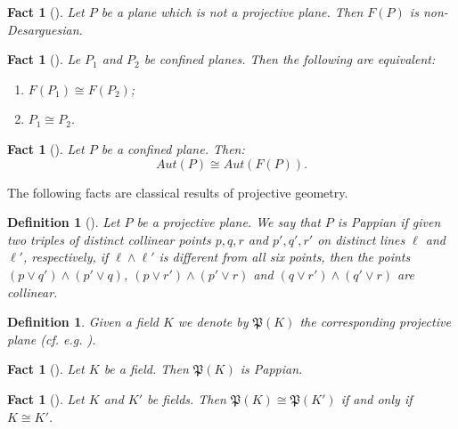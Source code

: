 \documentclass{amsart}
\newtheorem{definition}[theorem]{Definition}
\newtheorem{fact}[theorem]{Fact}
\numberwithin{claimcounter}{theorem}
\begin{document}
	\begin{fact}[{\cite[Theorem 4.6]{hall_proj}}]\label{desargue_fact} Let $P$ be a plane which is not a projective plane. Then $F(P)$ is non-Desarguesian.
\end{fact}

	\begin{fact}[{\cite[Theorem 11.11]{piper}}]\label{piper_fact1} Le $P_1$ and $P_2$ be confined planes. Then the following are equivalent:
	\begin{enumerate}[(1)]
	\item $F(P_1) \cong F(P_2)$;
	\item $P_1 \cong P_2$.
\end{enumerate}
\end{fact}

	\begin{fact}[{\cite[Theorem 11.18]{piper}}]\label{piper_fact2} Let $P$ be a confined plane. Then:
	$$Aut(P) \cong Aut(F(P)).$$
\end{fact}

	The following facts are classical results of projective geometry.
	
	\begin{definition}[{\cite[Definition 6.1.1]{steven}}]\label{pappian_def} Let $P$ be a projective plane. We say that $P$ is {\em Pappian} if given two triples of distinct collinear points $p, q, r$ and $p', q', r'$ on distinct lines $\ell$ and $\ell'$, respectively, if $\ell \wedge \ell'$ is different from all six points, then the points $(p \vee q') \wedge (p' \vee q)$, $(p \vee r') \wedge (p' \vee r)$ and $(q \vee r') \wedge (q' \vee r)$ are collinear.
\end{definition}

	\begin{definition} Given a field $K$ we denote by $\mathfrak{P}(K)$ the corresponding projective plane (cf. e.g. \cite[Section 2]{piper}).
\end{definition}

	\begin{fact}[{\cite[Theorem 2.6]{piper}}]\label{pappian_field_fact} Let $K$ be a field. Then $\mathfrak{P}(K)$ is Pappian.
\end{fact}

	\begin{fact}[{\cite[Theorem 2.8]{piper}}]\label{pappian_fact} Let $K$ and $K'$ be fields. Then $\mathfrak{P}(K) \cong \mathfrak{P}(K')$ if and only if $K \cong K'$.
\end{fact}
\end{document}
